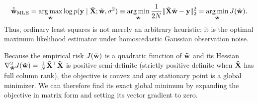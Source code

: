 \begin{deepdive}
\begin{equation}
\hat{\tilde{\mathbf{w}}}_{\text{MLE}} = \operatorname*{arg\,max}_{\tilde{\mathbf{w}}} \log p(\mathbf{y} \mid \tilde{\mathbf{X}}; \tilde{\mathbf{w}}, \sigma^2) \equiv \operatorname*{arg\,min}_{\tilde{\mathbf{w}}} \frac{1}{2N} \|\tilde{\mathbf{X}}\tilde{\mathbf{w}} - \mathbf{y}\|_2^2 = \operatorname*{arg\,min}_{\tilde{\mathbf{w}}} J(\tilde{\mathbf{w}}).
\label{eq:mle_equals_ols}
\end{equation}
Thus, ordinary least squares is not merely an arbitrary heuristic: it is the optimal maximum likelihood estimator under homoscedastic Gaussian observation noise.
\end{deepdive}

Because the empirical risk $J(\tilde{\mathbf{w}})$ is a quadratic function of $\tilde{\mathbf{w}}$ and its Hessian $\nabla_{\tilde{\mathbf{w}}}^2 J(\tilde{\mathbf{w}}) = \frac{1}{N}\tilde{\mathbf{X}}^\top \tilde{\mathbf{X}}$ is positive semi-definite (strictly positive definite when $\tilde{\mathbf{X}}$ has full column rank), the objective is convex and any stationary point is a global minimizer. We can therefore find its exact global minimum by expanding the objective in matrix form and setting its vector gradient to zero.

